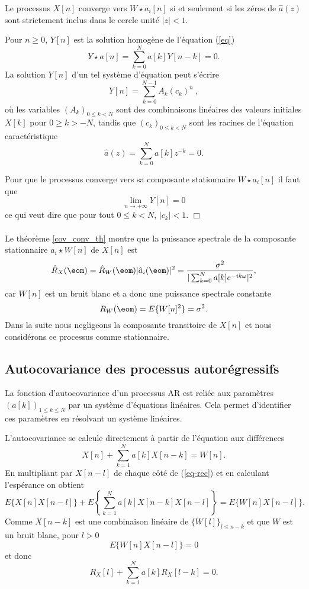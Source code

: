 \begin{theorem}
Le processus $X[n]$ converge vers $W \star a_i [n]$
si et seulement si les z\'eros de
$\hat a (z)$ sont strictement inclus dans le cercle unit\'e
$|z| < 1$.
\end{theorem}

Pour $n \geq 0$, 
$Y[n]$ est la solution homog\`ene de l'\'equation (\ref{eq})
\begin{equation}
\label{homogene}
Y \star a [n] = \sum_{k=0}^N a[k] Y[n-k] = 0 .
\end{equation}
La solution $Y[n]$ d'un tel syst\`eme d'\'equation peut s'\'ecrire
\[
Y[n] = \sum_{k=0}^{N-1} A_k (c_k)^n ~,
\]
o\`u les variables $(A_k)_{0 \leq k < N}$ 
sont des combinaisons lin\'eaires des
valeurs initiales $X[k]$ pour $0 \geq k > -N$,
tandis que $(c_k)_{0 \leq k < N}$ sont 
les racines de 
l'\'equation caract\'eristique 
\begin{equation}
\label{caracteristique}
\hat a (z) = \sum_{k=0}^N a[k] z^{-k} = 0 .
\end{equation}

Pour que le processus 
converge vers sa composante stationnaire $W \star a_i [n]$
il faut que
\[
\lim_{n \rightarrow + \infty} Y[n] = 0
\]
ce qui veut dire que 
pour tout $0 \leq k < N$, $|c_k| < 1$. $\Box$\\
\\
Le th\'eor\`eme \ref{cov_conv_th} montre
que la puissance spectrale de la composante stationnaire
$a_i \star W [n]$ de $X[n]$ est 
\[
\hat R_X (\eom) = \hat R_W(\eom) |\hat a_i (\eom)|^2 = 
\frac {\sigma^2} {|\sum_{k=0}^N a[k] e^{-ik\om}|^2} ,
\]
car $W[n]$ est un bruit blanc et a donc une puissance spectrale
constante
\[
R_W (\eom) = E\{W[n]^2\} = \sigma^2 .
\]
Dans la suite nous negligeons la composante transitoire de
$X[n]$ et nous consid\'erons ce processus comme stationnaire.

\subsection{Autocovariance des processus autor\'egressifs}

La fonction
d'autocovariance d'un processus AR est reli\'ee aux param\`etres
$(a[k] )_{1 \leq k \leq N}$ par un syst\`eme d'\'equations
lin\'eaires. Cela permet d'identifier ces param\`etres en
r\'esolvant un syst\`eme lin\'eaires.

L'autocovariance se calcule 
directement \`a partir de l'\'equation aux diff\'erences
\begin{equation}
\label{eq-rec}
X[n] + \sum_{k=1}^N a[k] X[n-k] = W[n] .
\end{equation}
En multipliant par $X[n-l]$ de chaque c\^ot\'e de (\ref{eq-rec})
et en calculant l'esp\'erance on obtient
\[
E\{X[n] X[n-l]\} + 
E\left\{\sum_{k=1}^N a[k] X[n-k] X[n-l]\right\} = 
E\{W[n] X[n-l]\} . 
\] 
Comme $X[n-k]$ est une combinaison lin\'eaire de 
$\{ W[l] \}_{l \leq n-k}$ et que $W$ est un
bruit blanc, pour $l > 0$ 
\[
E\{W [n] X[n-l]\} = 0
\]
et donc
\begin{equation}
\label{cov-rec}
R_X[l] + \sum_{k=1}^N a[k] R_X[l-k] = 0 .
\end{equation}

